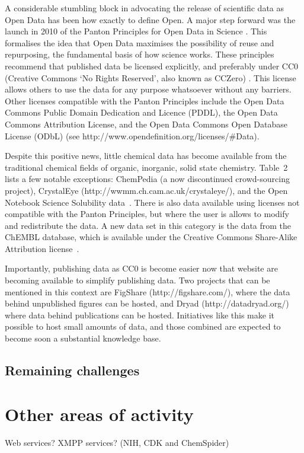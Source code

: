 \documentclass[10pt]{bmc_article}
\newenvironment{bmcformat}{\begin{raggedright}\baselineskip20pt\sloppy\setboolean{publ}{false}}{\end{raggedright}\baselineskip20pt\sloppy}
\begin{document}
\begin{bmcformat}
A considerable stumbling block in advocating the release of scientific
data as Open Data has been how exactly to define Open. A major step
forward was the launch in 2010 of the Panton Principles for Open Data
in Science \cite{WebPanton}. This formalises the idea that Open Data maximises the
possibility of reuse and repurposing, the fundamental basis
of how science works. These principles recommend that published data
be licensed explicitly, and preferably under CC0 (Creative Commons `No
Rights Reserved', also known as CCZero) \cite{WebCC0}. This license allows others to use the 
data for any purpose whatsoever without any barriers. Other licenses
compatible with the Panton Principles include the
Open Data Commons Public Domain Dedication and Licence (PDDL), the
Open Data Commons Attribution License, and the
Open Data Commons Open Database License (ODbL) (see
http://www.opendefinition.org/licenses/\#Data).

Despite this positive news, little chemical data has become
available from the traditional chemical fields of organic,
inorganic, solid state chemistry. Table~2 lists a few notable
exceptions: ChemPedia (a now discontinued crowd-sourcing project),
CrystalEye (http://wwmm.ch.cam.ac.uk/crystaleye/),
and the Open Notebook Science Solubility
data~\cite{ONS2010}. There is also data available using licenses
not compatible with the Panton Principles, but where the user
is allows to modify and redistribute the data. A new data
set in this category is the data from the ChEMBL database, 
which is available under the Creative Commons Share-Alike
Attribution license~\cite{Overington2009}.

Importantly, publishing data as CC0 is become easier now that
website are becoming available to simplify publishing data. Two
projects that can be mentioned in this context are FigShare
(http://figshare.com/), where the data behind unpublished figures
can be hosted, and Dryad (http://datadryad.org/) where data
behind publications can be hosted. Initiatives like this make
it possible to host small amounts of data, and those combined
are expected to become soon a substantial knowledge base.

  \subsection*{Remaining challenges}

\section*{Other areas of activity}
Web services? XMPP services? (NIH, CDK and ChemSpider)



\end{bmcformat}
\end{document}
